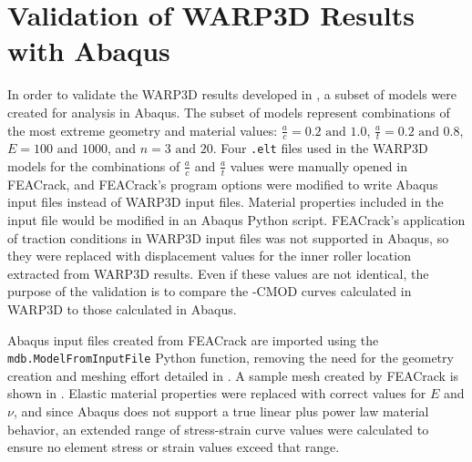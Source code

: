 \chapter{Validation of WARP3D \J Results with Abaqus} \label{chap:abaqus-validation}


In order to validate the WARP3D results developed in , a subset of models were created for analysis in Abaqus.
The subset of models represent combinations of the most extreme geometry and material values:
\(\frac{a}{c} = 0.2\text{ and } 1.0\), 
\(\frac{a}{t} = 0.2\text{ and } 0.8\), 
\(E = 100\text{ and } 1000\), and
\(n = 3\text{ and } 20\).
Four \verb|.elt| files used in the WARP3D models for the combinations of \(\frac{a}{c}\) and \(\frac{a}{t}\) values were manually opened in FEACrack, and FEACrack's program options were modified to write Abaqus input files instead of WARP3D input files.
Material properties included in the input file would be modified in an Abaqus Python script.
FEACrack's application of traction conditions in WARP3D input files was not supported in Abaqus, so they were replaced with displacement values for the inner roller location extracted from WARP3D results.
Even if these values are not identical, the purpose of the validation is to compare the \J-CMOD curves calculated in WARP3D to those calculated in Abaqus.

Abaqus input files created from FEACrack are imported using the \verb|mdb.ModelFromInputFile| Python function, removing the need for the geometry creation and meshing effort detailed in .
A sample mesh created by FEACrack is shown in .
Elastic material properties were replaced with correct values for \(E\) and \(\nu\), and since Abaqus does not support a true linear plus power law material behavior, an extended range of stress-strain curve values were calculated to ensure no element stress or strain values exceed that range.

